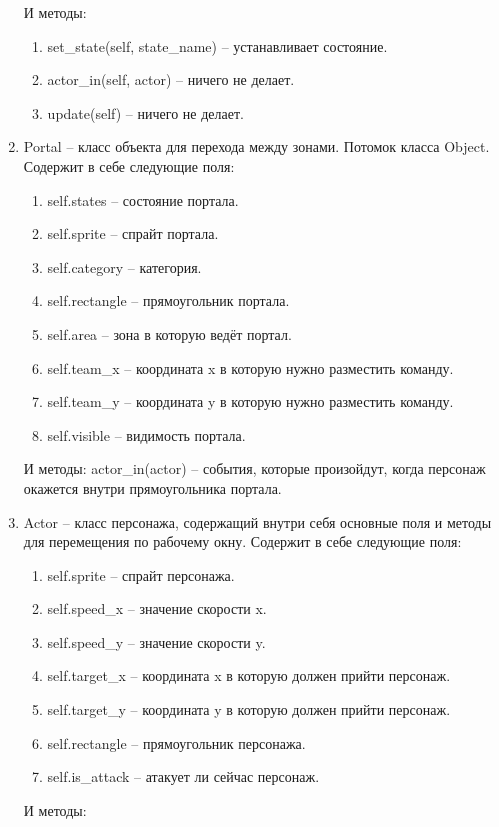 \begin{enumerate}
\begin{enumerate}
		\end{enumerate}
		И методы:
		\begin{enumerate}
			\item set\_state(self, state\_name) -- устанавливает состояние.
			\item actor\_in(self, actor) -- ничего не делает.
			\item update(self) -- ничего не делает.
		\end{enumerate}
	\item Portal -- класс объекта для перехода между зонами. Потомок класса Object. Содержит в себе следующие поля:
		\begin{enumerate}
			\item self.states -- состояние портала.
			\item self.sprite -- спрайт портала.
			\item self.category -- категория.
			\item self.rectangle -- прямоугольник портала.
			\item self.area -- зона в которую ведёт портал.
			\item self.team\_x -- координата x в  которую нужно разместить команду.
			\item self.team\_y -- координата y в  которую нужно разместить команду.
			\item self.visible -- видимость портала.
		\end{enumerate}
		И методы:
			actor\_in(actor) -- события, которые произойдут, когда персонаж окажется внутри прямоугольника портала.
	\item Actor -- класс персонажа, содержащий внутри себя основные поля и методы для перемещения по рабочему окну. Содержит в себе следующие поля:
		\begin{enumerate}
			\item self.sprite -- спрайт персонажа.
			\item self.speed\_x -- значение скорости x.
			\item self.speed\_y -- значение скорости y.
			\item self.target\_x -- координата x в которую должен прийти персонаж.
			\item self.target\_y -- координата y в которую должен прийти персонаж.
			\item self.rectangle -- прямоугольник персонажа.
			\item self.is\_attack -- атакует ли сейчас персонаж.
		\end{enumerate}
		И методы:
		\begin{enumerate}

\end{enumerate}
\end{enumerate}
